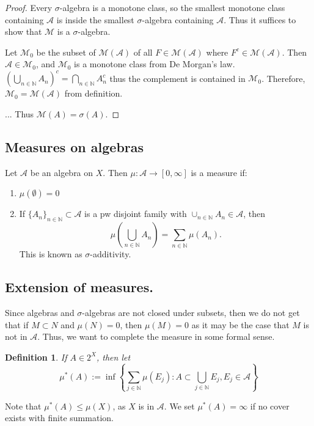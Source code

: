 \documentclass{article}
\newtheorem{definition}[theorem]{Definition}
\theoremstyle{definition}
\numberwithin{theorem}{section}
\numberwithin{equation}{section}
\newcommand{\alg}{\mathcal{A}}
\newcommand{\mono}{\mathcal{M}}
\begin{document}
\begin{proof}
	Every $\sigma$-algebra is a monotone class, so the smallest monotone class containing $\alg$ is inside the smallest $\sigma$-algebra containing $\alg$. Thus it suffices to show that $\mono$ is a $\sigma$-algebra.
	
	Let $\mono_0$ be the subset of $\mono(\alg)$ of all $F \in \mono(\alg)$ where $F^c \in \mono(\alg)$. Then $\alg \in \mono_0$, and $\mono_0$ is a monotone class from De Morgan's law. $(\bigcup_{n \in \mathbb{N}} A_n)^c = \bigcap_{n \in \mathbb{N}} A_n^c$ thus the complement is contained in $\mono_0$. Therefore, $\mono_0 = \mono(\alg)$ from definition.
	\par
	... Thus $\mono(A) = \sigma(A)$.
\end{proof}

\subsection{Measures on algebras}
Let $\alg$ be an algebra on $X$. Then $\mu : \alg \rightarrow [0, \infty]$ is a measure if:

\begin{enumerate}
	\item $\mu(\emptyset) = 0$
	\item If $\lbrace A_n \rbrace_{n \in \mathbb{N}} \subset \alg$ is a pw disjoint family with $\cup_{n \in \mathbb{N}} A_n \in \alg$, then
	\begin{equation}
		\mu \left( \bigcup_{n \in \mathbb{N}} A_n\right) = \sum_{n \in \mathbb{N}} \mu(A_n).
	\end{equation}
	This is known as $\sigma$-additivity.
\end{enumerate}

\subsection{Extension of measures.}
Since algebras and $\sigma$-algebras are not closed under subsets, then we do not get that if $M \subset N$ and $\mu(N) = 0$, then $\mu(M) = 0$ as it may be the case that $M$ is not in $\alg$. Thus, we want to complete the measure in some formal sense.

\begin{definition}
	If $A \in 2^X$, then let
	\begin{equation}
		\mu^*(A) := \inf \left\lbrace \sum_{j \in \mathbb{N}} \mu(E_j) : A \subset \bigcup_{j \in \mathbb{N}} E_j, E_j \in \alg \right\rbrace
	\end{equation}
\end{definition} 
Note that $\mu^*(A) \leq \mu(X)$, as $X$ is in $\alg$. We set $\mu^*(A) = \infty$ if no cover exists with finite summation.
\end{document}
